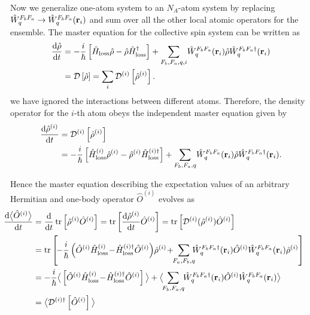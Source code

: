 Now we generalize one-atom system to an $ N_A $-atom system by replacing $\hat{W}_q^{F_bF_a}\rightarrow \hat{W}_q^{F_bF_a}(\mathbf{r}_i)  $ and sum over all the other local atomic operators for the ensemble.
The master equation for the collective spin system can be written as 
\begin{align}
\frac{{\mathrm d} {\hat{\rho}}}{{\mathrm d}t} &= -\frac{i}{\hbar}\left[\hat{H}_{\rm loss}\hat{\rho} -\hat{\rho}\hat{H}_{\rm loss}^\dagger\right] + \sum_{F_b,F_a,q,i}\! \hat{W}_q^{F_bF_a}(\mathbf{r}_i) \hat{\rho} \hat{W}_q^{F_bF_a \dagger}(\mathbf{r}_i) \\
&= \mathcal{D} \left[ \hat{\rho}\right]=\sum_i \mathcal{D}^{(i)} \left[\hat{\rho}^{(i)} \right].
\end{align}
we have ignored the interactions between different atoms. 
Therefore, the density operator for the $ i $-th atom obeys the independent master equation given by
\begin{align}
\dt{\hat{\rho}^{(i)}} &= \mathcal{D}^{(i)} \left[\hat{\rho}^{(i)} \right] \label{eq:drhoidtDi}\\
&= -\frac{i}{\hbar}\left[\hat{H}_{\rm loss}^{(i)} \hat{\rho}^{(i)} -\hat{\rho}^{(i)}\hat{H}_{\rm loss}^{(i)\dagger}\right] + \sum_{F_b,F_a,q}\! \hat{W}_q^{F_bF_a}(\br_i) \hat{\rho} \hat{W}_q^{F_bF_a \dagger}(\br_i).
\end{align}

Hence the master equation describing the expectation values of an arbitrary Hermitian and one-body operator $ \hat{O}^{(i)} $ evolves as
\begin{align}
\!\!\!\!\!\!\!\!\!\! \dt{\expect{\hat{O}^{(i)} }} &= \dt{}\tr\left[\hat{\rho}^{(i)}\hat{O}^{(i)} \right]=\tr\left[\dt{\hat{\rho}^{(i)}}\hat{O}^{(i)} \right]=\tr\left[\mathcal{D}^{(i)}(\hat{\rho}^{(i)})\hat{O}^{(i)} \right]\\
&= \tr\left[\! -\frac{i}{\hbar}\left(\hat{O}^{(i)}\hat{H}_{\rm loss}^{(i)}\!-\! \hat{H}_{\rm loss}^{(i)\dagger}\hat{O}^{(i)}  \right)\!\hat{\rho}^{(i)} \!+\! \!\sum_{F_a,F_b,q} \!\! \!\hat{W}_q^{F_bF_a\dagger}(\br_i) \hat{O}^{(i)} \hat{W}_q^{F_bF_a}(\br_i)\hat{\rho}^{(i)} \right]\\
&=-\frac{i}{\hbar}\expect{\left[\hat{O}^{(i)}\hat{H}_{\rm loss}^{(i)} \!-\! \hat{H}_{\rm loss}^{(i)\dagger}\hat{O}^{(i)}\right]}+ \expect{\!\!\sum_{F_b,F_a,q}\!\! \hat{W}_q^{F_bF_a\dagger}(\br_i) \hat{O}^{(i)} \hat{W}_q^{F_bF_a}(\br_i) }\\
&= \expect{\mathcal{D}^{(i)\dagger}\left[\hat{O}^{(i)} \right] }
\end{align}

